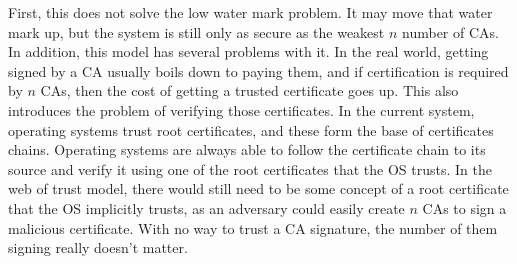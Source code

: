 \documentclass{jhwhw}
\begin{document}
First, this does not solve the low water mark problem. It may move that water mark up, but the system is still only as secure as the weakest $n$ number of CAs. In addition, this model has several problems with it. In the real world, getting signed by a CA usually boils down to paying them, and if certification is required by $n$ CAs, then the cost of getting a trusted certificate goes up. This also introduces the problem of verifying those certificates. In the current system, operating systems trust root certificates, and these form the base of certificates chains. Operating systems are always able to follow the certificate chain to its source and verify it using one of the root certificates that the OS trusts. In the web of trust model, there would still need to be some concept of a root certificate that the OS implicitly trusts, as an adversary could easily create $n$ CAs to sign a malicious certificate. With no way to trust a CA signature, the number of them signing really doesn't matter.
\end{document}
